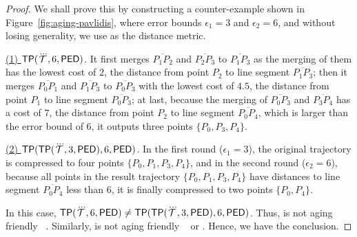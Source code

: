 \begin{proof}
	We shall prove this by constructing a counter-example shown in Figure~\ref{fig:aging-pavlidis}, where error bounds $\epsilon_1 =3$ and $\epsilon_2=6$, and without losing generality, we use \ped as the distance metric.

\underline{(1) ${{\mathsf{TP}}}(\dddot{\mathcal{T}}, 6, {\mathsf{PED}})$}. It first merges $\overline{P_1P_2}$ and $\overline{P_2P_3}$ to $\overline{P_1P_3}$ as the merging of them has the lowest cost of $2$, the distance from point $P_2$ to line segment $\overline{P_1P_3}$; then it merges $\overline{P_0P_1}$ and $\overline{P_1P_3}$ to $\overline{P_0P_3}$ with the lowest cost of $4.5$, the distance from point $P_1$ to line segment $\overline{P_0P_3}$; at last, because the merging of $\overline{P_0P_3}$ and $\overline{P_3P_4}$ has a cost of $7$, the distance from point $P_2$ to line segment $\overline{P_0P_4}$, which is larger than the error bound of $6$, it outputs three points $\{P_0, P_3, P_4\}$.

\underline{(2) ${{\mathsf{TP}}}({\mathsf{TP}}(\dddot{\mathcal{T}}, 3, {\mathsf{PED}}), 6, {\mathsf{PED}})$}. In the first round ($\epsilon_1=3$), the original trajectory is compressed to four points $\{P_0, P_1, P_3, P_4\}$, and in the second round ($\epsilon_2=6$), because all points in the result trajectory $\{P_0, P_1, P_3, P_4\}$ have distances to line segment $\overline{P_0P_4}$ less than $6$, it is finally compressed to two points $\{P_0, P_4\}$.

In this case, ${{\mathsf{TP}}}(\dddot{\mathcal{T}}, 6, {\mathsf{PED}}) \ne {{\ensuremath {\mathsf{TP}}}}({\mathsf{TP}}(\dddot{\mathcal{T}}, 3, {\mathsf{PED}}), 6, {\mathsf{PED}})$. Thus, \tpa is not aging friendly \wrt~\ped.
Similarly, \tpa is not aging friendly \wrt~ \sed or \dad. Hence, we have the conclusion.
\end{proof}


	

